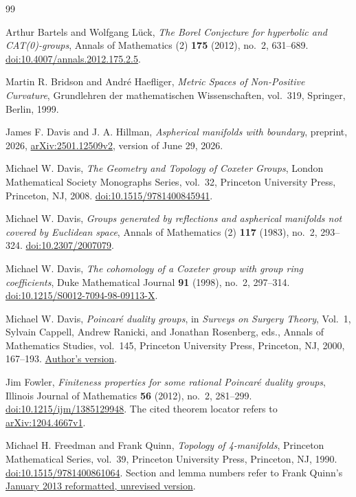 \documentclass[11pt]{article}
\theoremstyle{definition}
\theoremstyle{remark}
\begin{document}
{\raggedright\begin{thebibliography}{99}

Arthur Bartels and Wolfgang L\"uck,
\emph{The Borel Conjecture for hyperbolic and CAT(0)-groups},
Annals of Mathematics (2) \textbf{175} (2012), no.~2, 631--689.
\href{https://doi.org/10.4007/annals.2012.175.2.5}{doi:10.4007/annals.2012.175.2.5}.

Martin R. Bridson and Andr\'e Haefliger,
\emph{Metric Spaces of Non-Positive Curvature},
Grundlehren der mathematischen Wissenschaften, vol.~319,
Springer, Berlin, 1999.

James F. Davis and J. A. Hillman,
\emph{Aspherical manifolds with boundary},
preprint, 2026,
\href{https://arxiv.org/abs/2501.12509v2}{arXiv:2501.12509v2},
version of June 29, 2026.

Michael W. Davis,
\emph{The Geometry and Topology of Coxeter Groups},
London Mathematical Society Monographs Series, vol.~32,
Princeton University Press, Princeton, NJ, 2008.
\href{https://doi.org/10.1515/9781400845941}{doi:10.1515/9781400845941}.

Michael W. Davis,
\emph{Groups generated by reflections and aspherical manifolds not
covered by Euclidean space},
Annals of Mathematics (2) \textbf{117} (1983), no.~2, 293--324.
\href{https://doi.org/10.2307/2007079}{doi:10.2307/2007079}.

Michael W. Davis,
\emph{The cohomology of a Coxeter group with group ring coefficients},
Duke Mathematical Journal \textbf{91} (1998), no.~2, 297--314.
\href{https://doi.org/10.1215/S0012-7094-98-09113-X}{doi:10.1215/S0012-7094-98-09113-X}.

Michael W. Davis,
\emph{Poincar\'e duality groups},
in \emph{Surveys on Surgery Theory}, Vol.~1,
Sylvain Cappell, Andrew Ranicki, and Jonathan Rosenberg, eds.,
Annals of Mathematics Studies, vol.~145,
Princeton University Press, Princeton, NJ, 2000, 167--193.
\href{https://people.math.osu.edu/davis.12/pdgroup.pdf}{Author's version}.

Jim Fowler,
\emph{Finiteness properties for some rational Poincar\'e duality groups},
Illinois Journal of Mathematics \textbf{56} (2012), no.~2, 281--299.
\href{https://doi.org/10.1215/ijm/1385129948}{doi:10.1215/ijm/1385129948}.
The cited theorem locator refers to
\href{https://arxiv.org/abs/1204.4667v1}{arXiv:1204.4667v1}.

Michael H. Freedman and Frank Quinn,
\emph{Topology of 4-manifolds},
Princeton Mathematical Series, vol.~39,
Princeton University Press, Princeton, NJ, 1990.
\href{https://doi.org/10.1515/9781400861064}{doi:10.1515/9781400861064}.
Section and lemma numbers refer to Frank Quinn's
\href{https://archive.mpim-bonn.mpg.de/id/eprint/4789/2/FreedmanQuinn-TopologyOf4Manifolds-Reformatted2013.pdf}{January 2013 reformatted, unrevised version}.


\end{thebibliography}}
\end{document}
